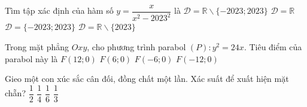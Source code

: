 \begin{ex}%
	Tìm tập xác định của hàm số $y=\dfrac{x}{x^2-2023^2}$ là 
	\choice
	{\True $\mathcal{D}=\mathbb{R}\backslash\{-2023; 2023\}$}
	{$\mathcal{D}=\mathbb{R}$}
	{$\mathcal{D}=\{-2023; 2023\}$}
	{$\mathcal{D}=\mathbb{R} \backslash\{2023\}$}
\end{ex}
\begin{ex}%
	Trong mặt phẳng $Oxy$, cho phương trình parabol $(P)\colon y^2=24x$. Tiêu điểm của parabol này là
	\choice
	{$F(12; 0)$}
	{\True $F(6; 0)$}
	{$F(-6; 0)$}
	{$F(-12; 0)$}
\end{ex}
\begin{ex}%
	Gieo một con xúc sắc cân đối, đồng chất một lần. Xác suất để xuất hiện mặt chẵn?
	\choice
	{\True $\dfrac{1}{2}$}
	{$\dfrac{1}{4}$}
	{$\dfrac{1}{6}$}
	{$\dfrac{1}{3}$}
\end{ex}

